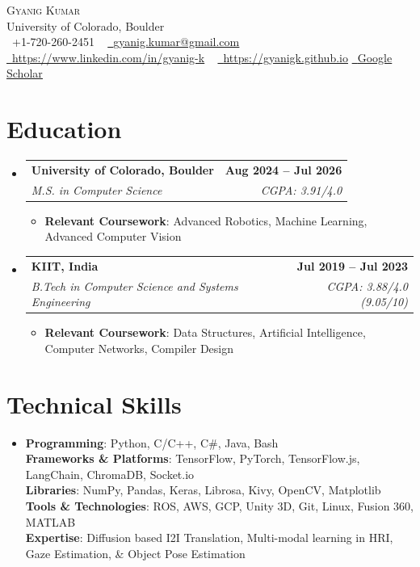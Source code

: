 \documentclass[letterpaper,10pt]{article}
\makeatletter
\newcommand{\resumeItem}[1]{
  \item\small{
    {#1 \vspace{-2pt}}
  }
}
\newcommand{\resumeSubheading}[4]{
  \vspace{-2pt}\item
    \begin{tabular*}{1.0\textwidth}[t]{l@{\extracolsep{\fill}}r}
      \textbf{#1} & \textbf{\small #2} \\
      \textit{\small#3} & \textit{\small #4} \\
    \end{tabular*}\vspace{-7pt}
}
\newcommand{\resumeSubHeadingListStart}{\begin{itemize}[leftmargin=0.0in, label={}]}
\newcommand{\resumeSubHeadingListEnd}{\end{itemize}}
\newcommand{\resumeItemListStart}{\begin{itemize}}
\newcommand{\resumeItemListEnd}{\end{itemize}\vspace{-5pt}}
\makeatother
\begin{document}
\begin{center}
    {\Huge \scshape Gyanig Kumar} \\ \vspace{1pt}
    University of Colorado, Boulder \\ \vspace{1pt}
    \small \raisebox{-0.1\height}\faPhone\ +1-720-260-2451 ~ \href{mailto:gyanig.kumar@gmail.com}{\raisebox{-0.2\height
}\faEnvelope\ \underline{gyanig.kumar@gmail.com}} ~ 
    \href{https://linkedin.com/in//}{\raisebox{-0.2\height}\faLinkedin\ \underline{{\href{https://www.linkedin.com/in/gyanig-k-b36666146/}{https://www.linkedin.com/in/gyanig-k}}}}  ~
    \href{https://github.com/}{\raisebox{-0.2\height}\faGithub\ \underline{https://gyanigk.github.io}}
    \href{https://scholar.google.com/citations?user=g1kxkMUAAAAJ&hl=en}{\raisebox{-0.2\height}\aiGoogleScholar\ \underline{Google Scholar}}
    \vspace{-8pt}
\end{center}



\section{Education}
  \resumeSubHeadingListStart
    \resumeSubheading
      {University of Colorado, Boulder}{Aug 2024 -- Jul 2026}
      {M.S. in Computer Science}{CGPA: 3.91/4.0}
      \resumeItemListStart
        \resumeItem{\textbf{Relevant Coursework}: Advanced Robotics, Machine Learning, Advanced Computer Vision}
      \resumeItemListEnd
    \resumeSubheading
      {KIIT, India}{Jul 2019 -- Jul 2023}
      {B.Tech in Computer Science and Systems Engineering}{CGPA: 3.88/4.0 (9.05/10)}
      \resumeItemListStart
        \resumeItem{\textbf{Relevant Coursework}: Data Structures, Artificial Intelligence, Computer Networks, Compiler Design}
      \resumeItemListEnd
  \resumeSubHeadingListEnd
\section{Technical Skills}
\begin{itemize}[leftmargin=0.15in, label={}]
  \item{
    \textbf{Programming}: Python, C/C++, C#, Java, Bash \\
    \textbf{Frameworks \& Platforms}: TensorFlow, PyTorch, TensorFlow.js, LangChain, ChromaDB, Socket.io \\
    \textbf{Libraries}: NumPy, Pandas, Keras, Librosa, Kivy, OpenCV, Matplotlib \\
    \textbf{Tools \& Technologies}: ROS, AWS, GCP, Unity 3D, Git, Linux, Fusion 360, MATLAB \\
    \textbf{Expertise}: Diffusion based I2I Translation, Multi-modal learning in HRI, Gaze Estimation, \& Object Pose Estimation
  }
\end{itemize}
\end{document}

